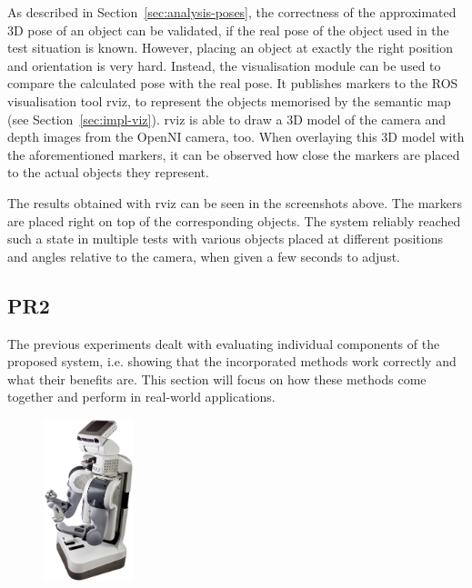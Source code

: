 As described in Section~\ref{sec:analysis-poses}, the correctness of the approximated 3D pose of an object can be validated, if the real pose of the object used in the test situation is known. However, placing an object at exactly the right position and orientation is very hard. Instead, the visualisation module can be used to compare the calculated pose with the real pose. It publishes markers to the ROS visualisation tool rviz, to represent the objects memorised by the semantic map (see Section~\ref{sec:impl-viz}). rviz is able to draw a 3D model of the camera and depth images from the OpenNI camera, too. When overlaying this 3D model with the aforementioned markers, it can be observed how close the markers are placed to the actual objects they represent.

The results obtained with rviz can be seen in the screenshots above. The markers are placed right on top of the corresponding objects. The system reliably reached such a state in multiple tests with various objects placed at different positions and angles relative to the camera, when given a few seconds to adjust.




\subsection{PR2}
\label{sec:experiment-pr2}
The previous experiments dealt with evaluating individual components of the proposed system, i.e. showing that the incorporated methods work correctly and what their benefits are. This section will focus on how these methods come together and perform in real-world applications. \\

\begin{figure}
  \vspace{-10pt}
  \centering
  \includegraphics[width=0.23\textwidth]{images/pr2.png}
  \vspace{-10pt}
\end{figure}

